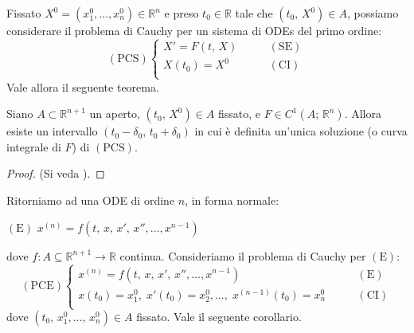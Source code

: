 Fissato $X^0 = (x_1^0,\ldots,x_n^0) \in \mathbb{R}^n$ e preso $t_0 \in \mathbb{R}$ tale che $(t_0,\,X^0) \in A$, possiamo considerare il problema di Cauchy per un sistema di ODEs del primo ordine:
$$
\mathrm{(PCS)}
\begin{cases}
X' = F(t,\,X) &\qquad \mathrm{(SE)}\\
X(t_0) = X^0 &\qquad \mathrm{(CI)}\\
\end{cases}
$$
Vale allora il seguente teorema.

\begin{thm}
Siano $A \subset \mathbb{R}^{n+1}$ un aperto, $(t_0,\,X^0) \in A$ fissato, e $F \in C^1(A;\,\mathbb{R}^n)$. Allora esiste un intervallo $(t_0-\delta_0,\,t_0+\delta_0)$ in cui è definita un'unica soluzione (o curva integrale di $F$) di $\mathrm{(PCS)}$.
\end{thm}
\begin{proof}
(Si veda \cite{Giusti2003}).
\end{proof}

Ritorniamo ad una ODE di ordine $n$, in forma normale:
\begin{center}
$\mathrm{(E)}$
\hfill
$\displaystyle
x^{(n)} = f(t,\,x,\,x',\,x'',\ldots,x^{n-1})
$
\hfill \null \\
\end{center}
dove $f : A \subseteq \mathbb{R}^{n+1} \longrightarrow \mathbb{R}$ continua. Consideriamo il problema di Cauchy per $\mathrm{(E)}$:
$$
\mathrm{(PCE)}
\begin{cases}
x^{(n)} = f(t,\,x,\,x',\,x'',\ldots,x^{n-1}) &\qquad \mathrm{(E)}\\
x(t_0) = x_1^0,\;x'(t_0) = x_2^0,\ldots,\;x^{(n-1)}(t_0) = x_n^0 &\qquad \mathrm{(CI)}\\
\end{cases}
$$
dove $(t_0,\,x_1^0,\ldots,\,x_n^0) \in A$ fissato. Vale il seguente corollario.

